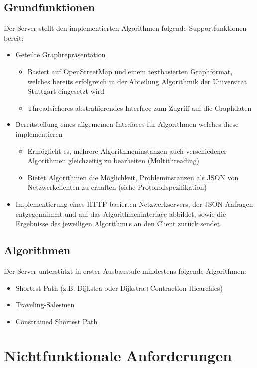 \documentclass[a4paper,10pt,titlepage]{article}
\begin{document}
\subsection{Grundfunktionen}
Der Server stellt den implementierten Algorithmen folgende Supportfunktionen bereit:
\begin{itemize}
 \item Geteilte Graphrepräsentation
  \begin{itemize}
   \item 
    Basiert auf OpenStreetMap und einem textbasierten Graphformat, welches 
    bereits erfolgreich in der Abteilung Algorithmik der Universität Stuttgart eingesetzt wird
   \item
    Threadsicheres abstrahierendes Interface zum Zugriff auf die Graphdaten
  \end{itemize}
  \item Bereitstellung eines allgemeinen Interfaces für Algorithmen welches diese implementieren
  \begin{itemize}
   \item Ermöglicht es, mehrere Algorithmeninstanzen auch verschiedener Algorithmen gleichzeitig zu bearbeiten (Multithreading)
   \item Bietet Algorithmen die Möglichkeit, Probleminstanzen als JSON von Netzwerkclienten zu erhalten (siehe Protokollspezifikation)
  \end{itemize}
 \item Implementierung eines HTTP-basierten Netzwerkservers, der JSON-Anfragen entgegennimmt und auf das Algorithmeninterface abbildet, sowie
 die Ergebnisse des jeweiligen Algorithmus an den Client zurück sendet.
\end{itemize}
\subsection{Algorithmen}
Der Server unterstützt in erster Ausbaustufe mindestens folgende Algorithmen:
\begin{itemize}
 \item Shortest Path (z.B. Dijkstra oder Dijkstra+Contraction Hiearchies)
 \item Traveling-Salesmen
 \item Constrained Shortest Path
\end{itemize}


\section{Nichtfunktionale Anforderungen}
\end{document}
